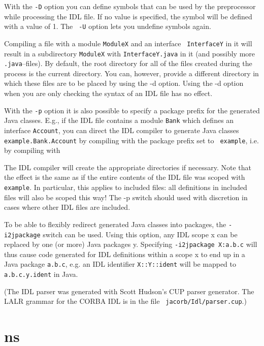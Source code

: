 \documentclass[12pt]{scrbook}
\begin{document}
With the  {\tt -D} option you can  define symbols that can  be used by
the  preprocessor while  processing  the  IDL file.   If  no value  is
specified, the  symbol will be  defined with a  value of 1. The {\tt
  -U} option lets you undefine symbols again.

Compiling a  file with  a module {\tt  ModuleX} and an  interface {\tt
  InterfaceY} in it  will result in a subdirectory  {\tt ModuleX} with
  {\tt    InterfaceY.java}   in   it    (and   possibly    more   {\tt
  .java}--files). By default, the root  directory for all of the files
  created  during  the process  is  the  current  directory. You  can,
  however, provide a  different directory in which these  files are to
  be placed by  using the -d option. Using the -d  option when you are
  only checking the syntax of an IDL file has no effect.

With the  {\tt -p}  option it  is also possible  to specify  a package
prefix for the generated Java  classes. E.g., if the IDL file contains
a module {\tt Bank} which  defines an interface {\tt Account}, you can
direct   the   IDL   compiler    to   generate   Java   classes   {\tt
example.Bank.Account} by compiling with the package prefix set to {\tt
example}, i.e. by compiling with


The IDL compiler will create the appropriate directories if necessary.
Note that the effect is the same as if the entire contents of the IDL
file was scoped with {\tt example}. In particular, this applies to
included files: all definitions in included files will also be scoped
this way! The -p switch should used with discretion in cases where
other IDL files are included.

To be able to flexibly redirect generated Java classes into packages,
the {\tt -i2jpackage} switch can be used. Using this option, any IDL
scope x can be replaced by one (or more) Java packages y. Specifying
{\tt -i2jpackage X:a.b.c} will thus cause code generated for IDL
definitions within a scope x to end up in a Java package {\tt a.b.c},
e.g. an IDL identifier {\tt X::Y::ident} will be mapped to {\tt
  a.b.c.y.ident} in Java.

(The  IDL  parser  was   generated  with  Scott  Hudson's  CUP  parser
generator.  The  LALR grammar for  the CORBA IDL  is in the  file {\tt
jacorb/Idl/parser.cup}.)

\section{ns}
\end{document}
